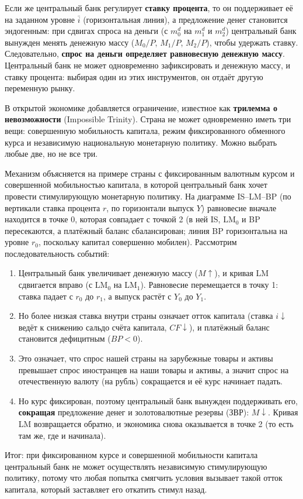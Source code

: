 \documentclass[11pt,a4paper]{article}
\begin{document}
Если же центральный банк регулирует \textbf{ставку процента}, то он поддерживает её на заданном уровне $\bar i$ (горизонтальная линия), а предложение денег становится эндогенным: при сдвигах спроса на деньги (с $m_0^d$ на $m_1^d$ и $m_2^d$) центральный банк вынужден менять денежную массу ($M_0/P$, $M_1/P$, $M_2/P$), чтобы удержать ставку. Следовательно, \textbf{спрос на деньги определяет равновесную денежную массу}. Центральный банк не может одновременно зафиксировать и денежную массу, и ставку процента: выбирая один из этих инструментов, он отдаёт другую переменную рынку.


В открытой экономике добавляется ограничение, известное как \textbf{трилемма о невозможности} (Impossible Trinity). Страна не может одновременно иметь три вещи: совершенную мобильность капитала, режим фиксированного обменного курса и независимую национальную монетарную политику. Можно выбрать любые две, но не все три.

Механизм объясняется на примере страны с фиксированным валютным курсом и совершенной мобильностью капитала, в которой центральный банк хочет провести стимулирующую монетарную политику. На диаграмме IS--LM--BP (по вертикали ставка процента $r$, по горизонтали выпуск $Y$) равновесие вначале находится в точке 0, которая совпадает с точкой 2 (в ней IS, LM$_0$ и BP пересекаются, а платёжный баланс сбалансирован; линия BP горизонтальна на уровне $r_0$, поскольку капитал совершенно мобилен). Рассмотрим последовательность событий:
\begin{enumerate}[leftmargin=1.6em]
\item Центральный банк увеличивает денежную массу ($M\uparrow$), и кривая LM сдвигается вправо (с LM$_0$ на LM$_1$). Равновесие перемещается в точку 1: ставка падает с $r_0$ до $r_1$, а выпуск растёт с $Y_0$ до $Y_1$.
\item Но более низкая ставка внутри страны означает отток капитала (ставка $i\downarrow$ ведёт к снижению сальдо счёта капитала, $CF\downarrow$), и платёжный баланс становится дефицитным ($BP<0$).
\item Это означает, что спрос нашей страны на зарубежные товары и активы превышает спрос иностранцев на наши товары и активы, а значит спрос на отечественную валюту (на рубль) сокращается и её курс начинает падать.
\item Но курс фиксирован, поэтому центральный банк вынужден поддерживать его, \textbf{сокращая} предложение денег и золотовалютные резервы (ЗВР): $M\downarrow$. Кривая LM возвращается обратно, и экономика снова оказывается в точке 2 (то есть там же, где и начинала).
\end{enumerate}
Итог: при фиксированном курсе и совершенной мобильности капитала центральный банк не может осуществлять независимую стимулирующую политику, потому что любая попытка смягчить условия вызывает такой отток капитала, который заставляет его откатить стимул назад.
\end{document}
